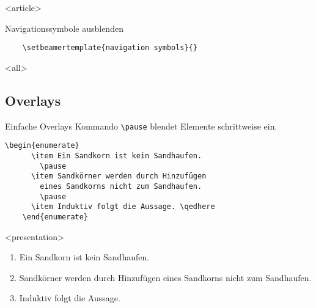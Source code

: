 \mode
<article>

\begin{Block}{Navigationssymbole ausblenden}
  \begin{lstlisting}[gobble=4]
    % hide navigation symbols
    \setbeamertemplate{navigation symbols}{}
  \end{lstlisting}
\end{Block}

\mode
<all>

\malte


\subsection{Overlays}

\begin{Frame}[fragile]{Einfache Overlays}
  Kommando \lstinline-\pause- blendet Elemente schrittweise ein.

  \begin{lstlisting}[gobble=4]
    \begin{enumerate}
      \item Ein Sandkorn ist kein Sandhaufen.
        \pause
      \item Sandkörner werden durch Hinzufügen
        eines Sandkorns nicht zum Sandhaufen.
        \pause
      \item Induktiv folgt die Aussage. \qedhere
    \end{enumerate}
  \end{lstlisting}

  \xxx

  \begin{onlyenv}<presentation>
    \begin{enumerate}
      \item Ein Sandkorn ist kein Sandhaufen.
        \pause
      \item Sandkörner werden durch Hinzufügen
        eines Sandkorns nicht zum Sandhaufen.
        \pause
      \item Induktiv folgt die Aussage. \qedhere
    \end{enumerate}
  \end{onlyenv}
\end{Frame}

